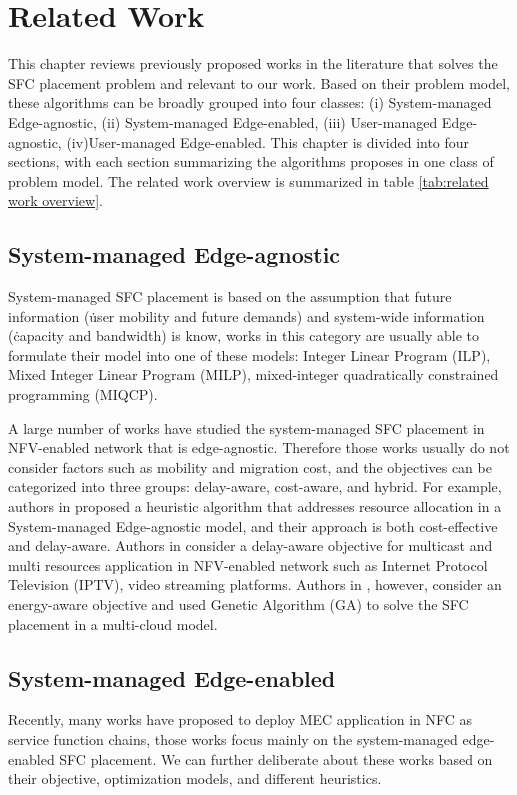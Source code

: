 \chapter{\textbf{Related Work}}
This chapter reviews previously proposed works in the literature that solves the SFC placement problem and relevant to our work. Based on their problem model, these algorithms can be broadly grouped into four classes: (i) System-managed Edge-agnostic, (ii) System-managed Edge-enabled, (iii) User-managed Edge-agnostic, (iv)User-managed Edge-enabled. This chapter is divided into four sections, with each section summarizing the algorithms proposes in one class of problem model. The related work overview is summarized in table \ref{tab:related work overview}.



\section{System-managed Edge-agnostic}
System-managed SFC placement is based on the assumption that future information (\eg\. user mobility and future demands) and system-wide information (\eg\.  capacity and bandwidth) is know,  works in this category are usually able to formulate their model into one of these models: Integer Linear Program (ILP), Mixed Integer Linear Program (MILP),  mixed-integer quadratically constrained programming (MIQCP).

A large number of works have studied the system-managed SFC placement in NFV-enabled network that is edge-agnostic. Therefore those works usually do not consider factors such as mobility and migration cost, and the objectives can be categorized into three groups: delay-aware, cost-aware, and hybrid. For example, authors in \cite{coDeC} proposed a heuristic algorithm that addresses resource allocation in a System-managed Edge-agnostic model, and their approach is both cost-effective and delay-aware. 
Authors in \cite{Delay-AwareMulti} consider a delay-aware objective for multicast and multi resources application in NFV-enabled network such as Internet Protocol Television (IPTV), video streaming
platforms.
Authors in \cite{AnEnergy-AwareSFCReconfiguration}, however, consider an energy-aware objective and used Genetic Algorithm (GA) to solve the SFC placement in a multi-cloud model.

\section{System-managed Edge-enabled}
Recently, many works have proposed to deploy MEC application in NFC as service function chains, those works focus mainly on the system-managed edge-enabled SFC placement. We can further deliberate about these works based on their objective, optimization models, and different heuristics.

